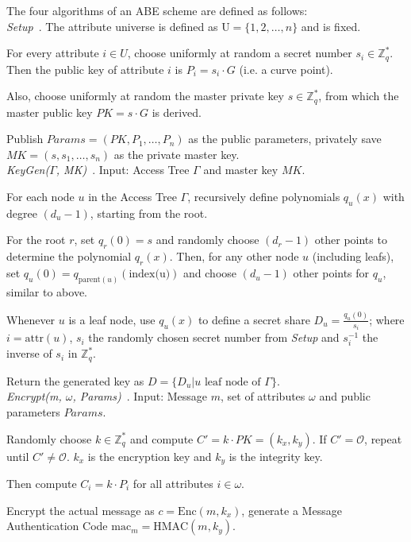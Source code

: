 The four algorithms of an ABE scheme are defined as follows: \\

\emph{Setup}~\cite{yao_lightweight_2015}.
The attribute universe is defined as $\text{U} = \{1, 2, \dots, n\}$ and is fixed.

For every attribute $i \in U$, choose uniformly at random a secret number $s_i \in \mathbb{Z}_q^*$. %
Then the public key of attribute $i$ is $P_i = s_i \cdot G$ (i.e. a curve point).

Also, choose uniformly at random the master private key $s \in \mathbb{Z}_q^*$, from which the master public key $PK = s \cdot G$ is derived.

Publish $Params=(PK, P_1, \dots, P_n)$ as the public parameters, privately save $MK = (s, s_1, \dots, s_n)$ as the private master key.
\\

\emph{KeyGen($\Gamma$, MK)}~\cite{yao_lightweight_2015}.
Input: Access Tree $\Gamma$ and master key $MK$.

For each node $u$ in the Access Tree $\Gamma$, recursively define polynomials $q_u(x)$ with degree $(d_u - 1)$, starting from the root.

For the root $r$, set $q_r(0) = s$ and randomly choose $(d_r - 1)$ other points to determine the polynomial $q_r(x)$.
Then, for any other node $u$ (including leafs), set $q_u(0) = q_{\text{parent}(u)}(\text{index(u)})$ and choose $(d_u -1)$ other points for $q_u$, similar to above.

Whenever $u$ is a leaf node, use $q_u(x)$ to define a secret share $D_u = \frac{q_u(0)}{s_i}$; where $i = \text{attr}(u)$, $s_i$ the randomly chosen secret number from \emph{Setup} and $s_i^{-1}$ the inverse of $s_i$ in $\mathbb{Z}_q^*$.

Return the generated key as $D = \{D_u | u \text{ leaf node of } \Gamma\}$.\\

\emph{Encrypt(m, $\omega$, Params)}~\cite{yao_lightweight_2015}.
Input: Message $m$, set of attributes $\omega$ and public parameters $Params$.

Randomly choose $k \in \mathbb{Z}_q^*$ and compute $C' = k \cdot PK = (k_x, k_y)$. If $C' = \mathcal{O}$, repeat until $C' \neq \mathcal{O}$.
$k_x$ is the encryption key and $k_y$ is the integrity key.

Then compute $C_i = k \cdot P_i$ for all attributes $i \in \omega$.

Encrypt the actual message as $c = \text{Enc}(m, k_x)$, generate a Message Authentication Code $\text{mac}_m = \text{HMAC}(m, k_y)$.

